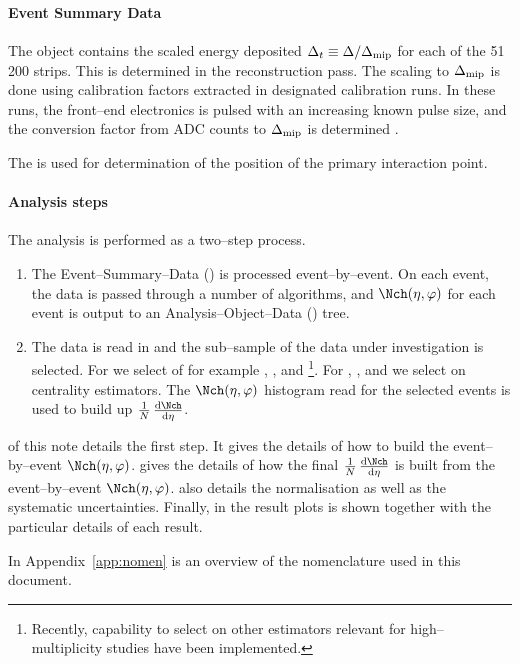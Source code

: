 \paragraph{Event Summary Data} 
The \FMD{} \ESD{} object contains the scaled energy deposited
$\Delta_t\equiv\Delta /\Delta_{\text{mip}}$ for each of the 51\,200 strips.  This
is determined in the reconstruction pass.  The scaling to $\Delta_{\text{mip}}$
is done using calibration factors extracted in designated calibration
runs.  In these runs, the front--end electronics is pulsed with an
increasing known pulse size, and the conversion factor from ADC counts
to $\Delta_{\text{mip}}$ is determined \cite{cholm:2009}.

The \SPD{} is used for determination of the position of the primary
interaction point.

\paragraph{Analysis steps} 
The analysis is performed as a two--step process.  
\begin{enumerate}
\item The Event--Summary--Data (\ESD{}) is processed event--by--event.
  On each event, the data is passed through a number of algorithms,
  and $\dndetadphi$ for each event is output to an
  Analysis--Object--Data (\AOD{}) tree.
\item The \AOD{} data is read in and the sub--sample of the data under
  investigation is selected. For \ppCol{} we select of for example
  \INEL{}, \INELONE{}, and \NSD{}\footnote{Recently, capability to
    select on other estimators relevant for high--multiplicity studies
    have been implemented.}. For \PbPbCol{}, \pPbCol{}, and \PbpCol{}
  we select on centrality estimators.  The $\dndetadphi$ histogram
  read for the selected events is used to build up $\ndndeta$.
\end{enumerate}

 of this note details the first step.  It gives
the details of how to build the event--by--event $\dndetadphi$.
 gives the details of how the final $\ndndeta$ is
built from the event--by--event $\dndetadphi$.  
also details the normalisation as well as the systematic
uncertainties.  Finally, in  the result plots is
shown together with the particular details of each result. 

In Appendix~\ref{app:nomen} is an overview of the nomenclature used in
this document.
